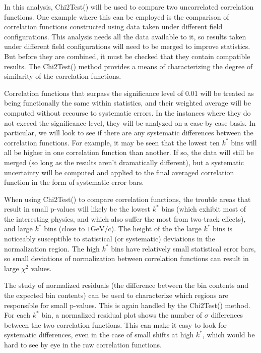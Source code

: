 In this analysis, Chi2Test() will be used to compare two uncorrelated correlation functions.  One example where this can be employed is the comparison of correlation functions constructed using data taken under different field configurations.  This analysis needs all the data available to it, so results taken under different field configurations will need to be merged to improve statistics.  But before they are combined, it must be checked that they contain compatible results.  The Chi2Test() method provides a means of characterizing the degree of similarity of the correlation functions.  

Correlation functions that surpass the significance level of 0.01 will be treated as  being functionally the same within statistics, and their weighted average will be computed without recourse to systematic errors. In the instances where they do not exceed the significance level, they will be analyzed on a case-by-case basis.  In particular, we will look to see if there are any systematic differences between the correlation functions.  For example, it may be seen that the lowest ten $k^*$ bins will all be higher in one correlation function than another.  If so, the data will still be merged (so long as the results aren't dramatically different), but a systematic uncertainty will be computed and applied to the final averaged correlation function in the form of systematic error bars.

When using Chi2Test() to compare correlation functions, the trouble areas that result in small p-values will likely be the lowest $k^*$ bins (which exhibit most of the interesting physics, and which also suffer the most from two-track effects), and large $k^*$ bins (close to $1 \mathrm{GeV/c}$).  The height of the the large $k^*$ bins is noticeably susceptible to statistical (or systematic) deviations in the normalization region.  The high $k^*$ bins have relatively small statistical error bars, so small deviations of normalization between correlation functions can result in large $\chi^2$ values.

The study of normalized residuals (the difference between the bin contents and the expected bin contents) can be used to characterize which regions are responsible for small p-values.  This is again handled by the Chi2Test() method.  For each $k^*$ bin, a normalized residual plot shows the number of $\sigma$ differences between the two correlation functions.  This can make it easy to look for systematic differences, even in the case of small shifts at high $k^*$, which would be hard to see by eye in the raw correlation functions.


